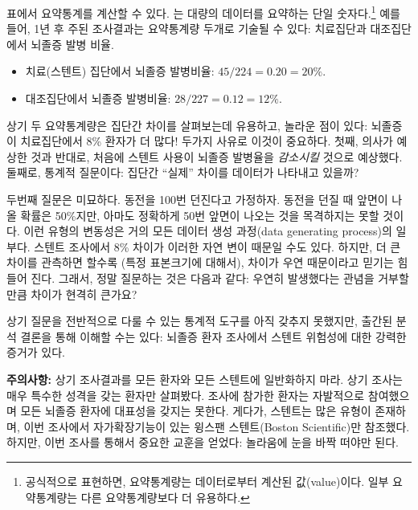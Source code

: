 표에서 요약통계를 계산할 수 있다.
는 대량의 데이터를 요약하는 단일 숫자다.\footnote{
공식적으로 표현하면, 요약통계량는 데이터로부터 계산된 값(value)이다. 일부 요약통계량는 다른 요약통계량보다 더 유용하다.} 예를 들어, 1년 후 주된 조사결과는 요약통계량 두개로 기술될 수 있다: 치료집단과 대조집단에서 뇌졸증 발병 비율.

\begin{itemize}
\setlength{\itemsep}{0mm}
\item[] 치료(스텐트) 집단에서 뇌졸증 발병비율: $45/224 = 0.20 = 20\%$.
\item[] 대조집단에서 뇌졸증 발병비율: $28/227 = 0.12 = 12\%$.
\end{itemize}

상기 두 요약통계량은 집단간 차이를 살펴보는데 유용하고, 놀라운 점이 있다:
뇌졸증이 치료집단에서 8\% 환자가 더 많다!
두가지 사유로 이것이 중요하다. 첫째, 의사가 예상한 것과 반대로, 처음에 스텐트 사용이 뇌졸증 발병율을 \emph{감소시킬} 것으로 예상했다.
둘째로, 통계적 질문이다: 집단간 ``실제'' 차이를 데이터가 나타내고 있을까?

두번째 질문은 미묘하다. 동전을 100번 던진다고 가정하자.
동전을 던질 때 앞면이 나올 확률은 50\%지만, 아마도 정확하게 50번 앞면이 나오는 것을 목격하지는 못할 것이다. 이런 유형의 변동성은 거의 모든 데이터 생성 과정(data generating process)의 일부다. 스텐트 조사에서 8\% 차이가 이러한 자연 변이 때문일 수도 있다.
하지만, 더 큰 차이를 관측하면 할수록 (특정 표본크기에 대해서), 차이가 우연 때문이라고 믿기는 힘들어 진다. 그래서, 정말 질문하는 것은 다음과 같다: 우연히 발생했다는 관념을 거부할만큼 차이가 현격히 큰가요?

상기 질문을 전반적으로 다룰 수 있는 통계적 도구를 아직 갖추지 못했지만, 출간된 분석 결론을 통해 이해할 수는 있다: 뇌졸증 환자 조사에서 스텐트 위험성에 대한 강력한 증거가 있다.

\textbf{주의사항:} 상기 조사결과를 모든 환자와 모든 스텐트에 일반화하지 마라.
상기 조사는 매우 특수한 성격을 갖는 환자만 살펴봤다. 조사에 참가한 환자는 자발적으로 참여했으며 모든 뇌졸증 환자에 대표성을 갖지는 못한다. 게다가,
스텐트는 많은 유형이 존재하며, 이번 조사에서 자가확장기능이 있는 윙스팬 스텐트(Boston Scientific)만 참조했다. 하지만, 이번 조사를 통해서 중요한 교훈을 얻었다: 
놀라움에 눈을 바짝 떠야만 된다.


